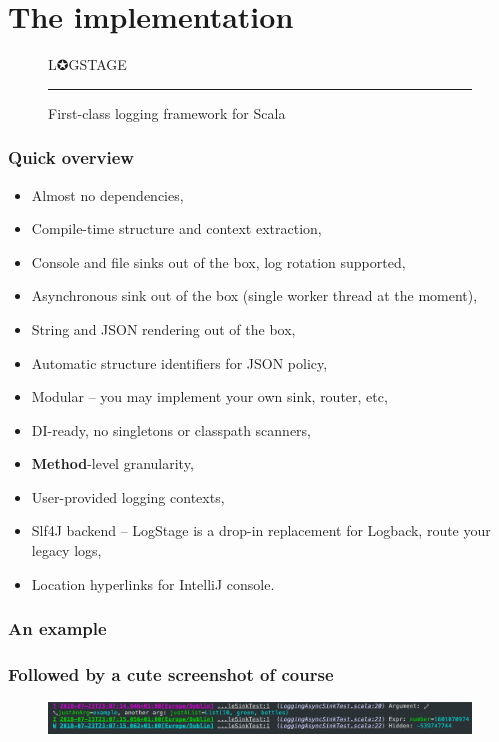 \documentclass[usenames,dvipsnames]{beamer}
\begin{document}
\section{The implementation}

\begin{frame}
\begin{figure}
\Huge 
\color{RubineRed} L✪GSTAGE
\noindent
{\color{RubineRed} \rule{\linewidth}{1mm} }
\Large First-class logging framework for Scala
\end{figure}
\end{frame}

\begin{frame}
\frametitle{Quick overview}
\begin{itemize}
\item Almost no dependencies,
\item Compile-time structure and context extraction,
\item Console and file sinks out of the box, log rotation supported,
\item Asynchronous sink out of the box (single worker thread at the moment),
\item String and JSON rendering out of the box,
\item Automatic structure identifiers for JSON policy,
\item Modular -- you may implement your own sink, router, etc,
\item DI-ready, no singletons or classpath scanners,
\item \textbf{Method}-level granularity,
\item User-provided logging contexts,
\item Slf4J backend -- LogStage is a drop-in replacement for Logback, route your legacy logs,
\item Location hyperlinks for IntelliJ console.
\end{itemize}
\end{frame}

\begin{frame}
\frametitle{An example}
\end{frame}

\begin{frame}
\frametitle{Followed by a cute screenshot of course}
\begin{figure}
    \includegraphics[width=\textwidth]{media/logstage-console.png}
\end{figure}
\end{frame}
\end{document}
